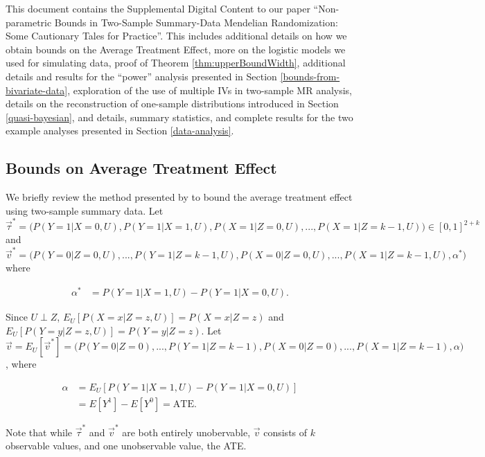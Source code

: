 \documentclass[
]{article}
\theoremstyle{plain}
\begin{document}
This document contains the Supplemental Digital Content to our paper ``Non-parametric Bounds in Two-Sample Summary-Data Mendelian Randomization: Some Cautionary Tales for Practice''. This includes additional details on how we obtain bounds on the Average Treatment Effect, more on the logistic models we used for simulating data, proof of Theorem \ref{thm:upperBoundWidth}, additional details and results for the ``power'' analysis presented in Section \ref{bounds-from-bivariate-data}, exploration of the use of multiple IVs in two-sample MR analysis, details on the reconstruction of one-sample distributions introduced in Section \ref{quasi-bayesian}, and details, summary statistics, and complete results for the two example analyses presented in Section \ref{data-analysis}.

\hypertarget{bounds-on-average-treatment-effect}{%
\subsection{Bounds on Average Treatment Effect}\label{bounds-on-average-treatment-effect}}

We briefly review the method presented by \textcite{ramsahai_causal_2012} to bound the average treatment effect using two-sample summary data. Let \(\vec{\tau}^* = \Big(P(Y = 1 | X = 0, U), P(Y = 1 | X = 1, U), P(X = 1 | Z = 0, U), ..., P(X = 1 | Z = k-1, U)\Big) \in [0,1]^{2+k}\) and \(\vec{v}^* = \Big(P(Y = 0 | Z = 0, U), ..., P(Y = 1 | Z = k-1, U), P(X = 0 | Z = 0, U), ..., P(X = 1 | Z = k-1, U), \alpha^*\Big)\) where

\[
\begin{aligned}
\alpha^* &= P(Y = 1 | X = 1, U) - P(Y = 1 | X = 0, U).
\end{aligned}
\]

Since \(U \perp Z\), \(E_U[P(X = x | Z = z, U)] = P(X = x | Z = z)\) and \(E_U[P(Y = y | Z = z, U)] = P(Y = y | Z = z)\). Let \(\vec{v} = E_U[\vec{v}^*] = \Big(P(Y = 0 | Z = 0), ..., P(Y = 1 | Z = k-1), P(X = 0 | Z = 0), ..., P(X = 1 | Z = k-1), \alpha \Big)\), where

\[
\begin{aligned}
\alpha &= E_U[P(Y = 1 | X = 1, U) - P(Y = 1 | X = 0, U)] \\
       &= E[Y^1] - E[Y^0] = \text{ATE}.
\end{aligned}
\]

Note that while \(\vec{\tau}^*\) and \(\vec{v}^*\) are both entirely unobervable, \(\vec{v}\) consists of \(k\) observable values, and one unobservable value, the ATE.
\end{document}
